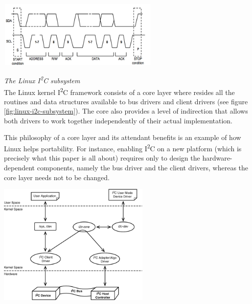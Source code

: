 \documentclass[a4paper,10pt]{article}
\makeatletter
\newenvironment{figurehere}{\def\@captype{figure}\vspace{2ex}}{\vspace{2ex}}
\newcommand{\icc}{I\textsuperscript{2}C }
\makeatother
\begin{document}
\begin{multicols}{2}
\begin{figurehere}
 \centering
 \includegraphics[width=8cm, height=3.3cm]{./figures/i2c-transaction.jpg}
 \caption{Sample \icc transaction (adapted from \emph{www.ermicro/blog}).}
 \label{fig:i2c-transaction}
\end{figurehere}

\emph{The Linux \icc subsystem}\\[6pt]
The Linux kernel \icc framework consists of a core layer where resides all the
routines and data structures available to bus drivers and client drivers (see
figure \ref{fig:linux-i2c-subsystem}).
The core also provides a level of indirection that allows both drivers to work
together independently of their actual implementation.

This philosophy of a core layer and its attendant benefits is an example of how
Linux helps portability. For instance, enabling \icc on a new platform (which is
precisely what this paper is all about) requires only to design the
hardware-dependent components, namely the bus driver and the client drivers,
whereas the core layer needs not to be changed.

\begin{figurehere}
 \centering
 \includegraphics[width=7.5cm, height=6cm]{./figures/linux-i2c-subsystem.png}
 \caption{The Limux \icc subsystem (reprinted from \cite{venkateswaran2008eldd},
 		p. 236).}
 \label{fig:linux-i2c-subsystem}
\end{figurehere}




\end{multicols}
\end{document}
